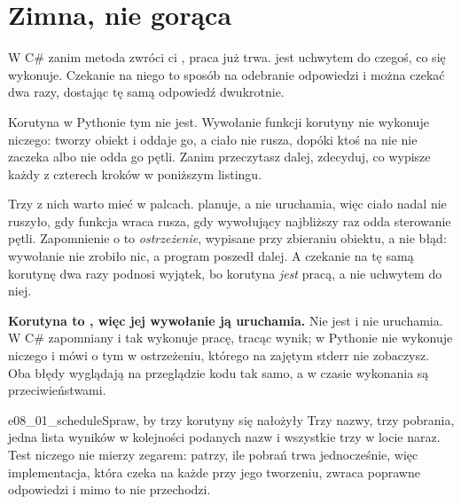 \section{Zimna, nie gorąca}
\label{sec:asyncio-cold}

W C\# zanim metoda zwróci ci , praca już trwa.  jest
uchwytem do czegoś, co się wykonuje. Czekanie na niego to sposób na
odebranie odpowiedzi i można czekać dwa razy, dostając tę samą odpowiedź
dwukrotnie.

Korutyna w Pythonie tym nie jest. Wywołanie funkcji korutyny nie wykonuje
niczego: tworzy obiekt i oddaje go, a ciało nie rusza, dopóki ktoś na nie
nie zaczeka albo nie odda go pętli. Zanim przeczytasz dalej, zdecyduj, co
wypisze każdy z czterech kroków w poniższym listingu.



\noindent
Trzy z nich warto mieć w palcach.  planuje, a nie
uruchamia, więc ciało nadal nie ruszyło, gdy funkcja wraca \dash{} rusza,
gdy wywołujący najbliższy raz odda sterowanie pętli. Zapomnienie o
 to \emph{ostrzeżenie}, wypisane przy zbieraniu obiektu, a nie
błąd: wywołanie nie zrobiło nic, a program poszedł dalej. A czekanie na tę
samą korutynę dwa razy podnosi wyjątek, bo korutyna \emph{jest} pracą, a
nie uchwytem do niej.


\begin{trapbox}
\textbf{Korutyna to , więc jej wywołanie ją uruchamia.} Nie jest
i nie uruchamia. W C\# zapomniany  i tak wykonuje pracę, tracąc
wynik; w Pythonie nie wykonuje niczego i mówi o tym w ostrzeżeniu, którego
na zajętym stderr nie zobaczysz. Oba błędy wyglądają na przeglądzie kodu
tak samo, a w czasie wykonania są przeciwieństwami.
\end{trapbox}

\begin{exercise}{e08_01_schedule}{Spraw, by trzy korutyny się nałożyły}
Trzy nazwy, trzy pobrania, jedna lista wyników w kolejności podanych nazw
\dash{} i wszystkie trzy w locie naraz. Test niczego nie mierzy zegarem:
patrzy, ile pobrań trwa jednocześnie, więc implementacja, która czeka na
każde przy jego tworzeniu, zwraca poprawne odpowiedzi i mimo to nie
przechodzi.
\end{exercise}

